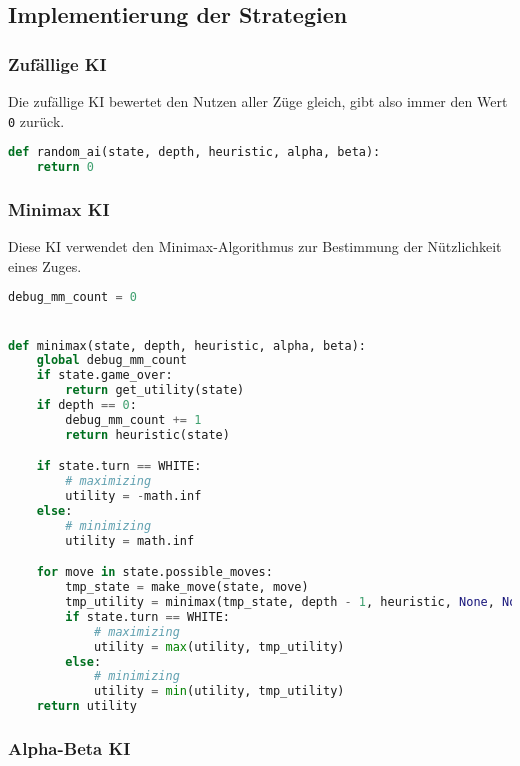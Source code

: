 \hypertarget{implementierung-der-strategien}{%
\subsection{Implementierung der
Strategien}\label{implementierung-der-strategien}}

\hypertarget{zufuxe4llige-ki}{%
\subsubsection{Zufällige KI}\label{zufuxe4llige-ki}}

Die zufällige KI bewertet den Nutzen aller Züge gleich, gibt also immer
den Wert \passthrough{\lstinline!0!} zurück.

\begin{lstlisting}[language=Python]
def random_ai(state, depth, heuristic, alpha, beta):
    return 0
\end{lstlisting}

\hypertarget{minimax-ki}{%
\subsubsection{Minimax KI}\label{minimax-ki}}

Diese KI verwendet den Minimax-Algorithmus zur Bestimmung der
Nützlichkeit eines Zuges.

\begin{lstlisting}[language=Python]
debug_mm_count = 0


def minimax(state, depth, heuristic, alpha, beta):
    global debug_mm_count
    if state.game_over:
        return get_utility(state)
    if depth == 0:
        debug_mm_count += 1
        return heuristic(state)

    if state.turn == WHITE:
        # maximizing
        utility = -math.inf
    else:
        # minimizing
        utility = math.inf

    for move in state.possible_moves:
        tmp_state = make_move(state, move)
        tmp_utility = minimax(tmp_state, depth - 1, heuristic, None, None)
        if state.turn == WHITE:
            # maximizing
            utility = max(utility, tmp_utility)
        else:
            # minimizing
            utility = min(utility, tmp_utility)
    return utility
\end{lstlisting}

\hypertarget{alpha-beta-ki}{%
\subsubsection{Alpha-Beta KI}\label{alpha-beta-ki}}

